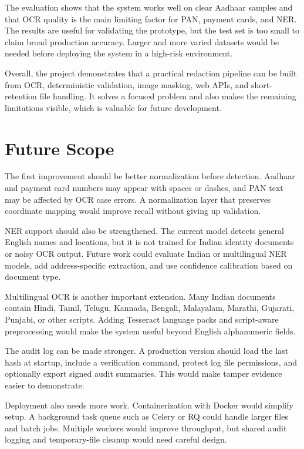 The evaluation shows that the system works well on clear Aadhaar samples and that OCR quality is the main limiting factor for PAN, payment cards, and NER. The results are useful for validating the prototype, but the test set is too small to claim broad production accuracy. Larger and more varied datasets would be needed before deploying the system in a high-risk environment.

Overall, the project demonstrates that a practical redaction pipeline can be built from OCR, deterministic validation, image masking, web APIs, and short-retention file handling. It solves a focused problem and also makes the remaining limitations visible, which is valuable for future development.

\section{Future Scope}

The first improvement should be better normalization before detection. Aadhaar and payment card numbers may appear with spaces or dashes, and PAN text may be affected by OCR case errors. A normalization layer that preserves coordinate mapping would improve recall without giving up validation.

NER support should also be strengthened. The current model detects general English names and locations, but it is not trained for Indian identity documents or noisy OCR output. Future work could evaluate Indian or multilingual NER models, add address-specific extraction, and use confidence calibration based on document type.

Multilingual OCR is another important extension. Many Indian documents contain Hindi, Tamil, Telugu, Kannada, Bengali, Malayalam, Marathi, Gujarati, Punjabi, or other scripts. Adding Tesseract language packs and script-aware preprocessing would make the system useful beyond English alphanumeric fields.

The audit log can be made stronger. A production version should load the last hash at startup, include a verification command, protect log file permissions, and optionally export signed audit summaries. This would make tamper evidence easier to demonstrate.

Deployment also needs more work. Containerization with Docker would simplify setup. A background task queue such as Celery or RQ could handle larger files and batch jobs. Multiple workers would improve throughput, but shared audit logging and temporary-file cleanup would need careful design.

